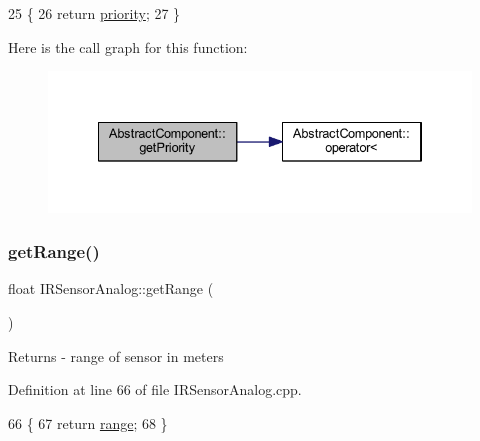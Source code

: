 \begin{DoxyCode}
25                       \{
26         \textcolor{keywordflow}{return} \hyperlink{class_abstract_component_aff57dfa5f31be093a06b55560e33fb95}{priority};
27     \}
\end{DoxyCode}
Here is the call graph for this function\+:
\nopagebreak
\begin{figure}[H]
\begin{center}
\leavevmode
\includegraphics[width=334pt]{class_abstract_component_ac0b440d1d642ff1292ec3c544d75a8f1_cgraph}
\end{center}
\end{figure}
\mbox{\label{class_i_r_sensor_analog_aa6642b85ec1018980e216eab0dfd27f2}} 
\subsubsection{\texorpdfstring{get\+Range()}{getRange()}}
{\footnotesize\ttfamily float I\+R\+Sensor\+Analog\+::get\+Range (\begin{DoxyParamCaption}{ }\end{DoxyParamCaption})}

\begin{DoxyReturn}{Returns}
-\/ range of sensor in meters 
\end{DoxyReturn}


Definition at line 66 of file I\+R\+Sensor\+Analog.\+cpp.


\begin{DoxyCode}
66                                \{
67     \textcolor{keywordflow}{return} \hyperlink{class_i_r_sensor_analog_a7463c4bbf714764667ac9d7527ced012}{range};
68 \}
\end{DoxyCode}
\mbox{\label{class_abstract_component_a0c2e458144111c5f599c66f168516abc}} 
